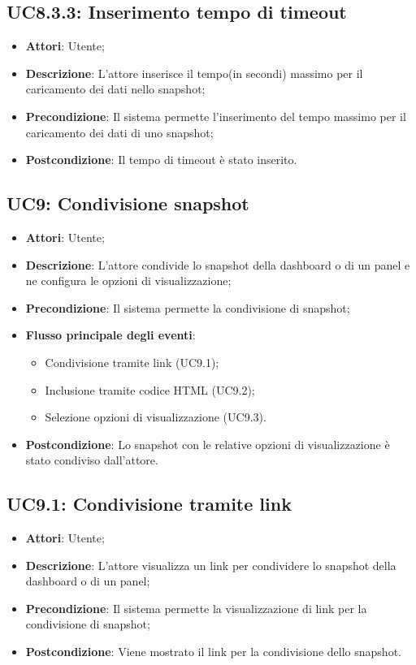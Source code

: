 \subsection{UC8.3.3: Inserimento tempo di timeout}
\begin{itemize}
	\item \textbf{Attori}: Utente;
	\item \textbf{Descrizione}: L'attore inserisce il tempo(in secondi) massimo per il caricamento dei dati nello snapshot;
	\item \textbf{Precondizione}: Il sistema permette l'inserimento del tempo massimo per il caricamento dei dati di uno snapshot;
	\item \textbf{Postcondizione}: Il tempo di timeout è stato inserito.
\end{itemize}

\subsection{UC9: Condivisione snapshot}
\begin{itemize}
	\item \textbf{Attori}: Utente;
	\item \textbf{Descrizione}: L'attore condivide lo snapshot della dashboard o di un panel e ne configura le opzioni di visualizzazione;
	\item \textbf{Precondizione}: Il sistema permette la condivisione di snapshot;
	\item \textbf{Flusso principale degli eventi}:
	\begin{itemize}
		\item Condivisione tramite link (UC9.1);
		\item Inclusione tramite codice HTML (UC9.2);
		\item Selezione opzioni di visualizzazione (UC9.3).
	\end{itemize}
	\item \textbf{Postcondizione}: Lo snapshot con le relative opzioni di visualizzazione è stato condiviso dall'attore.
\end{itemize}

\subsection{UC9.1: Condivisione tramite link}
\begin{itemize}
	\item \textbf{Attori}: Utente;
	\item \textbf{Descrizione}: L'attore visualizza un link per condividere lo snapshot della dashboard o di un panel;
	\item \textbf{Precondizione}: Il sistema permette la visualizzazione di link per la condivisione di snapshot;
	\item \textbf{Postcondizione}: Viene mostrato il link per la condivisione dello snapshot.
\end{itemize}

